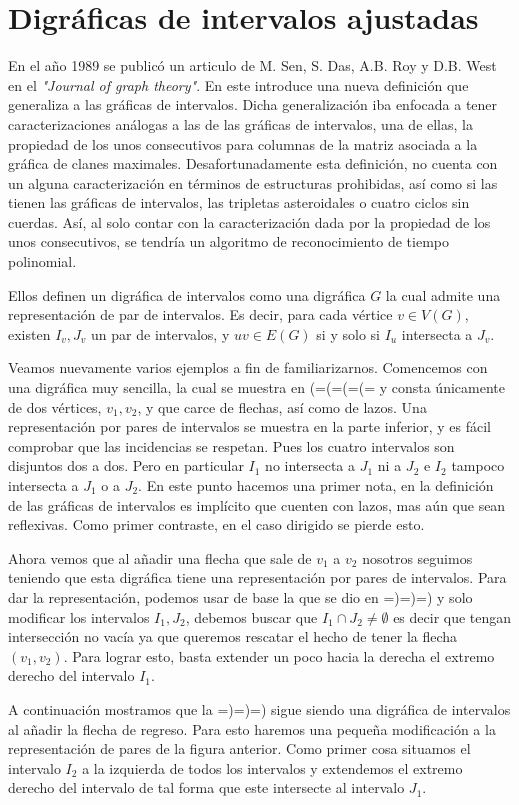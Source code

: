 \chapter{Digráficas de intervalos ajustadas}
\label{cap:DigrafIntAj}

En el año 1989 se publicó un articulo de M. Sen, S. Das, A.B. Roy y D.B. West en el  \textit{"Journal of graph theory"}. En este introduce una nueva definición que generaliza a las gráficas de intervalos. Dicha generalización iba enfocada a tener caracterizaciones análogas a las de las gráficas de intervalos, una de ellas, la propiedad de los unos consecutivos para columnas de la matriz asociada a la gráfica de clanes maximales. 
Desafortunadamente esta definición, no cuenta con un alguna caracterización en términos de estructuras prohibidas, así como si las tienen las gráficas de intervalos, las tripletas asteroidales o cuatro ciclos sin cuerdas. Así, al solo contar con la caracterización dada por la propiedad de los unos consecutivos, se tendría un algoritmo de reconocimiento de tiempo polinomial.

Ellos definen un digráfica de intervalos como una digráfica $G$ la cual admite una representación de par de intervalos. Es decir, para cada vértice $v\in V(G)$, existen $I_v,J_v$ un par de intervalos, y $uv\in E(G)$ si y solo si $I_u$ intersecta a $J_v$. 

Veamos nuevamente varios ejemplos a fin de familiarizarnos. Comencemos con una digráfica muy sencilla, la cual se muestra en (=(=(=(= y consta únicamente de dos vértices, $v_1, v_2$, y que carce de flechas, así como de lazos. Una representación por pares de intervalos se muestra en la parte inferior, y es fácil comprobar que las incidencias se respetan. Pues los cuatro intervalos son disjuntos dos a dos. Pero en particular $I_1$ no intersecta a $J_1$ ni a $J_2$ e $I_2$ tampoco intersecta a $J_1$ o a $J_2$. En este punto hacemos una primer nota, en la definición de las gráficas de intervalos es implícito que cuenten con lazos, mas aún que sean reflexivas. Como primer contraste, en el caso dirigido se pierde esto. 

Ahora vemos que al añadir una flecha que sale de $v_1$ a $v_2$ nosotros seguimos teniendo que esta digráfica tiene una representación por pares de intervalos. Para dar la representación, podemos usar de base la que se dio en =)=)=) y solo modificar los intervalos $I_1,J_2$, debemos buscar que $I_1\cap J_2 \neq \emptyset$ es decir que tengan intersección no vacía ya que queremos rescatar el hecho de tener la flecha $(v_1,v_2)$. Para lograr esto, basta extender un poco hacia la derecha el extremo derecho del intervalo $I_1$. 

A continuación mostramos que la =)=)=) sigue siendo una digráfica de intervalos al añadir la flecha de regreso. Para esto haremos una pequeña modificación a la representación de pares de la figura anterior. Como primer cosa situamos el intervalo $I_2$ a la izquierda de todos los intervalos y extendemos el extremo derecho del intervalo de tal forma que este intersecte al intervalo $J_1$.
